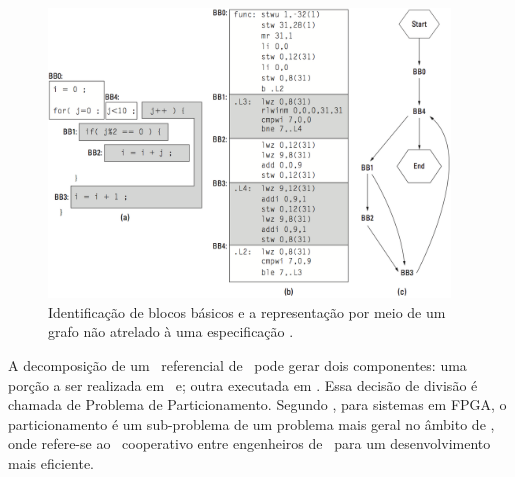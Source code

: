       \begin{figure}[h] \centering
         \includegraphics[width=0.95\textwidth]{img/f3-6.png}
         \caption{Identificação de blocos básicos e a representação por meio de um grafo não atrelado à uma especificação \hs.}
         \label{fig:f3-6}
      \end{figure}

      A decomposição de um \design\ referencial de \software\ pode gerar dois componentes: uma porção a ser realizada em \hardware\ e; outra executada em \software.
      Essa decisão de divisão é chamada de Problema de Particionamento.
      Segundo \citeauthor{Sass2010}, para sistemas em FPGA, o particionamento é um sub-problema de um problema mais geral no âmbito de \codesign, onde refere-se ao \design\ cooperativo entre engenheiros de \hs\ para um desenvolvimento mais eficiente.%

